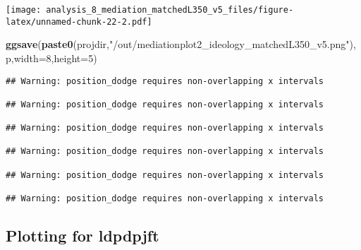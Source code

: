 \documentclass[
]{article}
\newenvironment{Shaded}{\begin{snugshade}}{\end{snugshade}}
\newcommand{\DataTypeTok}[1]{\textcolor[rgb]{0.13,0.29,0.53}{#1}}
\newcommand{\DecValTok}[1]{\textcolor[rgb]{0.00,0.00,0.81}{#1}}
\newcommand{\KeywordTok}[1]{\textcolor[rgb]{0.13,0.29,0.53}{\textbf{#1}}}
\newcommand{\NormalTok}[1]{#1}
\newcommand{\StringTok}[1]{\textcolor[rgb]{0.31,0.60,0.02}{#1}}
\begin{document}
\texttt{[image: analysis\_8\_mediation\_matchedL350\_v5\_files/figure-latex/unnamed-chunk-22-2.pdf]}

\begin{Shaded}
\begin{Highlighting}[]
\KeywordTok{ggsave}\NormalTok{(}\KeywordTok{paste0}\NormalTok{(projdir,}\StringTok{"/out/mediationplot2_ideology_matchedL350_v5.png"}\NormalTok{),p,}\DataTypeTok{width=}\DecValTok{8}\NormalTok{,}\DataTypeTok{height=}\DecValTok{5}\NormalTok{)}
\end{Highlighting}
\end{Shaded}

\begin{verbatim}
## Warning: position_dodge requires non-overlapping x intervals

## Warning: position_dodge requires non-overlapping x intervals

## Warning: position_dodge requires non-overlapping x intervals

## Warning: position_dodge requires non-overlapping x intervals

## Warning: position_dodge requires non-overlapping x intervals

## Warning: position_dodge requires non-overlapping x intervals
\end{verbatim}

\hypertarget{plotting-for-ldpdpjft}{%
\subsection{Plotting for ldpdpjft}\label{plotting-for-ldpdpjft}}
\end{document}
